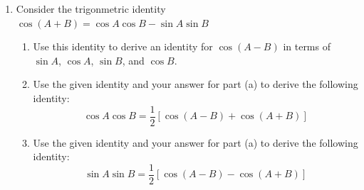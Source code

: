 \documentclass[12pt]{article}
\newif\ifans
\begin{document}
\begin{enumerate}
\begin{enumerate}
\ifans{\fbox{\parbox{1\linewidth}{Adding the given identity to the identity from part (a) and then dividing both sides by 2 yields the desired result.}}} \fi

\end{enumerate}

\item Consider the trigonmetric identity $\cos{(A+B)}=\cos{A}\cos{B}-\sin{A}\sin{B}$

\begin{enumerate}

\item Use this identity to derive an identity for $\cos{(A-B)}$ in terms of $\sin{A}$, $\cos{A}$, $\sin{B}$, and $\cos{B}$.

\ifans{\fbox{$\cos{(A-B)}=\cos{A}\cos{B}+\sin{A}\sin{B}$}} \fi

\item Use the given identity and your answer for part (a) to derive the following identity: $$\cos{A}\cos{B}=\frac{1}{2}\left[\cos{(A-B)}+\cos{(A+B)}\right]$$

\ifans{\fbox{\parbox{1\linewidth}{Adding the given identity to the identity from part (a) and then dividing both sides by 2 yields the desired result.}}} \fi

\item Use the given identity and your answer for part (a) to derive the following identity: $$\sin{A}\sin{B}=\frac{1}{2}\left[\cos{(A-B)}-\cos{(A+B)}\right]$$

\ifans{\fbox{\parbox{1\linewidth}{Subtracting the given identity from the identity from part (a) and then dividing both sides by 2 yields the desired result.}}} \fi

\end{enumerate}

\end{enumerate}

\end{document}
